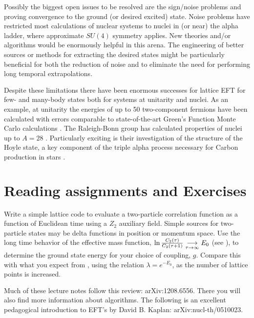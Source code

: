 Possibly the biggest open issues to be resolved are the sign/noise problems and proving convergence to the ground (or desired excited) state. Noise problems have restricted most calculations of nuclear systems to nuclei in (or near) the alpha ladder, where approximate $SU(4)$ symmetry applies. New theories and/or algorithms would be enormously helpful in this arena. The engineering of better sources or methods for extracting the desired states might be particularly beneficial for both the reduction of noise and to eliminate the need for performing long temporal extrapolations.

Despite these limitations there have been enormous successes for lattice EFT for few- and many-body states both for systems at unitarity and nuclei. As an example, at unitarity the energies of up to 50 two-component fermions have been calculated with errors comparable to state-of-the-art Green's Function Monte Carlo calculations \cite{EKLN1,EKLN2,EKLN3,EKLN4,LEKN1,NEKL1}. The Raleigh-Bonn group has calculated properties of nuclei up to $A=28$ \cite{Epelbaum:2010xt,Epelbaum:2009pd,Epelbaum:2013paa,Lahde:2013kma,Lahde:2013uqa}. Particularly exciting is their investigation of the structure of the Hoyle state, a key component of the triple alpha process necessary for Carbon production in stars \cite{Epelbaum:2011md,Epelbaum:2012qn,Epelbaum:2012iu,Epelbaum:2013wla,Lahde:2014bna}. 

\section{Reading assignments and Exercises}

\begin{prob}
Write a simple lattice code to evaluate a two-particle correlation function as a function of Euclidean time using a $Z_2$ auxiliary field. Simple sources for two-particle states may be delta functions in position or momentum space. Use the long time behavior of the effective mass function, $\ln \frac{C_2(\tau)}{C_2(\tau+1)} \underset{\tau \to\infty}{\longrightarrow} E_0$ (see ), to determine the ground state energy for your choice of coupling, $g$. Compare this with what you expect from , using the relation $\lambda = e^{-E_0}$, as the number of lattice points is increased.
\end{prob}


\begin{prob}
Much of these lecture notes follow this review: arXiv:1208.6556. There you will also find more information about algorithms. The following is an excellent pedagogical introduction to EFT's by David B. Kaplan: arXiv:nucl-th/0510023.
\end{prob}

